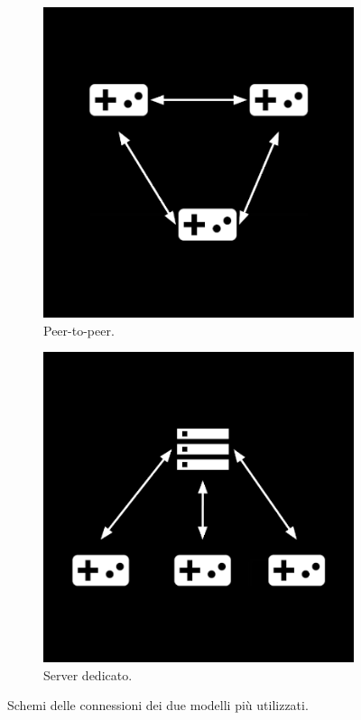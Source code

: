 \begin{figure}[!ht]
    \begin{subfigure}{.49\textwidth}
      \centering
      \includegraphics[width=.95\linewidth]{gfx/imgs/chapter3/PeerToPeerSchema.png}
      \caption{Peer-to-peer.}
      \label{fig:peer-to-peer}
    \end{subfigure}
    \begin{subfigure}{.49\textwidth}
      \centering
      \includegraphics[width=.95\linewidth]{gfx/imgs/chapter3/DedicatedServerSchema.png}
      \caption{Server dedicato.}
      \label{fig:dedicated-server}
    \end{subfigure}
    \caption{Schemi delle connessioni dei due modelli più utilizzati.}
    \label{fig:authoritative-server}
\end{figure}

